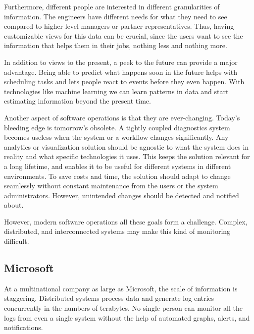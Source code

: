 \documentclass[english,12pt,a4paper,pdftex,sci,utf8]{aaltothesis}
\theoremstyle{definition}
\begin{document}
Furthermore, different people are interested in different granularities of information.
The engineers have different needs for what they need to see compared to higher level managers
or partner representatives.
Thus, having customizable views for this data can be crucial,
since the users want to see the information that helps them in their jobs, nothing less and nothing more.

In addition to views to the present, a peek to the future can provide a major advantage.
Being able to predict what happens soon in the future helps with scheduling tasks and lets people react 
to events before they even happen. With technologies like machine learning we can learn patterns in data and 
start estimating information beyond the present time.

Another aspect of software operations is that they are ever-changing. 
Today's bleeding edge is tomorrow's obsolete. A tightly coupled diagnostics system
becomes useless when the system or a workflow changes significantly. Any analytics or visualization solution should
be agnostic to what the system does in reality and what specific technologies it uses. 
This keeps the solution relevant for a long lifetime, 
and enables it to be useful for different systems in different environments. 
To save costs and time, the solution should adapt to change seamlessly without constant maintenance from the users or the system administrators. However, unintended changes should be detected and notified about.

However, modern software operations all these goals form a challenge.
Complex, distributed, and interconnected systems may make this kind of monitoring difficult.

\subsection{Microsoft}
At a multinational company as large as Microsoft, the scale of information is staggering.
Distributed systems process data and generate log entries concurrently in the numbers of terabytes.
No single person can monitor all the logs from even a single system without the help of automated
graphs, alerts, and notifications.  
\end{document}
